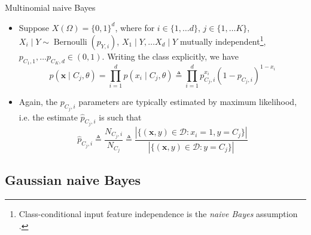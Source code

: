 \documentclass{beamer}
\numberwithin{equation}{section}
\begin{document}
\begin{frame}{Multinomial naive Bayes}
    \begin{itemize}
        \item
        Suppose $ X(\Omega) = \{0, 1\}^d $, where for $ i \in
        \{1, \ldots d\} $, $ j \in \{1, \ldots K\} $,
        $ X_i \mid Y \sim \operatorname{Bernoulli}(p_{Y, i}) $,
         $ X_1 \mid Y, \ldots X_d \mid Y $ mutually independent\footnote{
            Class-conditional input feature independence is the
            \textit{naive Bayes} assumption \cite{bishop_ml}.
        }, $ p_{C_1, 1}, \ldots p_{C_K, d} \in (0, 1) $. Writing the class
        explicitly, we have
        \begin{equation} \label{bern_nb_like}
            p(\mathbf{x} \mid C_j, \theta) =
            \prod_{i = 1}^dp(x_i \mid C_j, \theta) \triangleq
            \prod_{i = 1}^dp_{C_j, i}^{x_i}(1 - p_{C_j, i})^{1 - x_i}
        \end{equation}

        \item
        Again, the $ p_{C_j, i} $ parameters are typically estimated by
        maximum likelihood, i.e. the estimate $ \hat{p}_{C_j, i} $ is such that
        \begin{equation} \label{bern_nb_param_mle}
            \hat{p}_{C_j, i} \triangleq \frac{N_{C_j, i}}{N_{C_j}} \triangleq
            \frac{
                |\{(\mathbf{x}, y) \in \mathcal{D} : x_i = 1, y = C_j\}|
            }{
                |\{(\mathbf{x}, y) \in \mathcal{D} : y = C_j\}|
            } 
        \end{equation}
    \end{itemize}
\end{frame}

\subsection{Gaussian naive Bayes}
\end{document}
